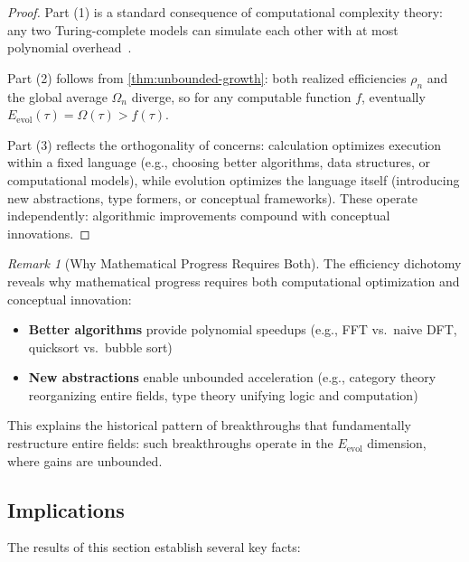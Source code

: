 \documentclass[11pt]{article}
\theoremstyle{definition}
\theoremstyle{remark}
\newtheorem{remark}[theorem]{Remark}
\begin{document}
\begin{proof}
Part (1) is a standard consequence of computational complexity theory: any two Turing-complete models can simulate each other with at most polynomial overhead~\cite{arora2009computational}.

Part (2) follows from \cref{thm:unbounded-growth}: both realized efficiencies $\rho_n$ and the global average $\Omega_n$ diverge, so for any computable function $f$, eventually $E_{\text{evol}}(\tau) = \Omega(\tau) > f(\tau)$.

Part (3) reflects the orthogonality of concerns: calculation optimizes execution within a fixed language (e.g., choosing better algorithms, data structures, or computational models), while evolution optimizes the language itself (introducing new abstractions, type formers, or conceptual frameworks). These operate independently: algorithmic improvements compound with conceptual innovations.
\end{proof}

\begin{remark}[Why Mathematical Progress Requires Both]
\label{rem:both-dimensions}
The efficiency dichotomy reveals why mathematical progress requires both computational optimization and conceptual innovation:
\begin{itemize}
\item \textbf{Better algorithms} provide polynomial speedups (e.g., FFT vs.\ naive DFT, quicksort vs.\ bubble sort)
\item \textbf{New abstractions} enable unbounded acceleration (e.g., category theory reorganizing entire fields, type theory unifying logic and computation)
\end{itemize}
This explains the historical pattern of breakthroughs that fundamentally restructure entire fields: such breakthroughs operate in the $E_{\text{evol}}$ dimension, where gains are unbounded.
\end{remark}

\subsection{Implications}

The results of this section establish several key facts:
\end{document}
